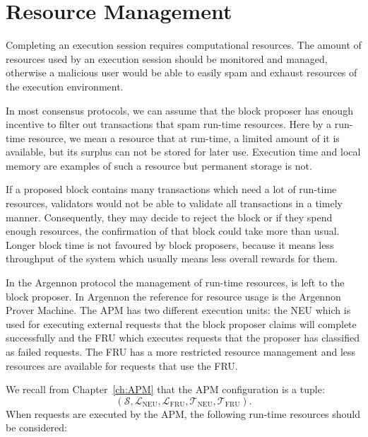 \section{Resource Management}\label{sec:res-man}

Completing an execution session requires computational resources. The amount of resources used by an execution session
should be monitored and managed, otherwise a malicious user would be able to easily spam and exhaust resources of the
execution environment.

In most consensus protocols, we can assume that the block proposer has enough incentive to filter out transactions
that spam run-time resources. Here by a run-time resource, we mean a resource that at run-time, a limited amount
of it is available, but its surplus can not be stored for later use. Execution time and local memory are
examples of such a resource but permanent storage is not.

If a proposed block contains many transactions which need a lot of run-time resources, validators would not
be able to validate all transactions in a timely manner. Consequently, they may decide to reject the block or if they
spend enough resources, the confirmation of that block could take more than usual. Longer block time is not
favoured by block proposers, because it means less throughput of the system which usually means less overall rewards
for them.

In the Argennon protocol the management of run-time resources, is left to the block proposer.
In Argennon the reference for resource usage is the Argennon Prover Machine. The APM has two different execution
units: the NEU which is used for executing external requests that the block proposer claims will complete
successfully and the FRU which executes requests that the proposer has classified as failed requests. The FRU has a
more restricted resource management and less resources are available for requests that use the FRU\@.

We recall from Chapter~\ref{ch:APM} that the APM configuration is a tuple:
\[
(\mathcal{S},\mathcal{L}_{\text{NEU}},\mathcal{L}_{\text{FRU}},\mathcal{T}_{\text{NEU}},\mathcal{T}_{\text{FRU}}).
\]
When requests are executed by the APM, the following run-time resources should be considered:

